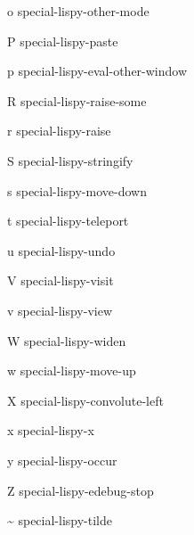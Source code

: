 \documentclass[a4paper,10pt]{article}
\newcommand\keyify[1]{\keys{\ttfamily#1}}
\begin{document}
\begin{multicols*}{3}
\begin{keylist}[labelwidth=\widthof{\keyify{+}}]
	\item[o] special-lispy-other-mode
	\item[P] special-lispy-paste
	\item[p] special-lispy-eval-other-window
	\item[R] special-lispy-raise-some
	\item[r] special-lispy-raise
	\item[S] special-lispy-stringify
	\item[s] special-lispy-move-down
	\item[t] special-lispy-teleport
	\item[u] special-lispy-undo
	\item[V] special-lispy-visit
	\item[v] special-lispy-view
	\item[W] special-lispy-widen
	\item[w] special-lispy-move-up
	\item[X] special-lispy-convolute-left
	\item[x] special-lispy-x
	\item[y] special-lispy-occur
	\item[Z] special-lispy-edebug-stop
	\item[\textasciitilde] special-lispy-tilde
\end{keylist}



\end{multicols*}
\end{document}

